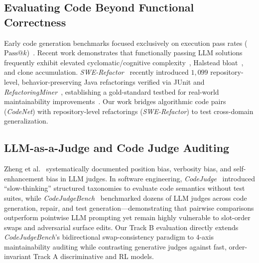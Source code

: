 \documentclass[conference]{IEEEtran}
\begin{document}
\subsection{Evaluating Code Beyond Functional Correctness}
Early code generation benchmarks focused exclusively on execution pass rates ($\text{Pass@}k$)~\cite{chen2021codex, puri2021codenet, jimenez2024swebench}. Recent work demonstrates that functionally passing LLM solutions frequently exhibit elevated cyclomatic/cognitive complexity~\cite{mccabe1976complexity, campbell2018cognitive}, Halstead bloat~\cite{halstead1977elements}, and clone accumulation. \textit{SWE-Refactor}~\cite{swerefactor2025} recently introduced $1{,}099$ repository-level, behavior-preserving Java refactorings verified via JUnit and \textit{RefactoringMiner}~\cite{tsantalis2022refactoringminer}, establishing a gold-standard testbed for real-world maintainability improvements~\cite{fowler2018refactoring}. Our work bridges algorithmic code pairs (\textit{CodeNet}) with repository-level refactorings (\textit{SWE-Refactor}) to test cross-domain generalization.

\subsection{LLM-as-a-Judge and Code Judge Auditing}
Zheng et al.~\cite{zheng2023judging} systematically documented position bias, verbosity bias, and self-enhancement bias in LLM judges. In software engineering, \textit{CodeJudge}~\cite{tong2024codejudge} introduced ``slow-thinking'' structured taxonomies to evaluate code semantics without test suites, while \textit{CodeJudgeBench}~\cite{codejudgebench2025} benchmarked dozens of LLM judges across code generation, repair, and test generation---demonstrating that pairwise comparisons outperform pointwise LLM prompting yet remain highly vulnerable to slot-order swaps and adversarial surface edits. Our Track B evaluation directly extends \textit{CodeJudgeBench}'s bidirectional swap-consistency paradigm to $4$-axis maintainability auditing while contrasting generative judges against fast, order-invariant Track A discriminative and RL models.
\end{document}
